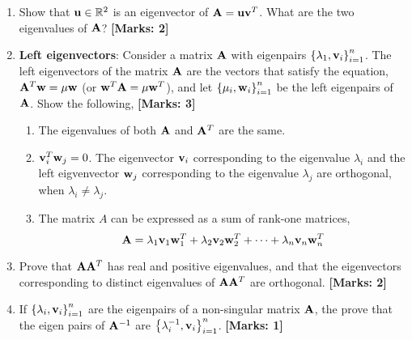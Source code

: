 \documentclass[12pt]{article}
\def\mf{\ensuremath\mathbf}
\def\mb{\ensuremath\mathbb}
\def\lc{\ensuremath\left\{}
\def\rc{\ensuremath\right\}}
\begin{document}
\begin{enumerate}
     \item Show that $\mf{u} \in \mb{R}^2$ is an eigenvector of $\mf{A} = \mf{u}\mf{v}^T$. What are the two eigenvalues of $\mf{A}$? \textbf{[Marks: 2]}

     \item \textbf{Left eigenvectors}: Consider a matrix $\mf{A}$ with eigenpairs $\lc \lambda_1, \mf{v}_i\rc_{i=1}^n$. The left eigenvectors of the matrix $\mf{A}$ are the vectors that satisfy the equation, $\mf{A}^T\mf{w} = \mu \mf{w}$ (or $\mf{w}^T\mf{A} = \mu \mf{w}^T$), and let $\lc \mu_i, \mf{w}_i\rc_{i=1}^n$ be the left eigenpairs of $\mf{A}$. Show the following, \textbf{[Marks: 3]}
     \begin{enumerate}
         \item The eigenvalues of both $\mf{A}$ and $\mf{A}^T$ are the same.
         \item $\mf{v}_i^T\mf{w}_j = 0$. The eigenvector $\mf{v}_i$ corresponding to the eigenvalue $\lambda_i$ and the left eigvenvector $\mf{w}_j$ corresponding to the eigenvalue $\lambda_j$ are orthogonal, when $\lambda_i \neq \lambda_j$.
         \item The matrix $A$ can be expressed as a sum of rank-one matrices,
         \[ \mf{A} = \lambda_1\mf{v}_1\mf{w}_1^T + \lambda_2\mf{v}_2\mf{w}_2^T + \cdots + \lambda_n\mf{v}_n\mf{w}_n^T\]
     \end{enumerate}

     \item Prove that $\mf{A}\mf{A}^T$ has real and positive eigenvalues, and that the eigenvectors corresponding to distinct eigenvalues of $\mf{A}\mf{A}^T$ are orthogonal. \textbf{[Marks: 2]}

     \item If $\lc \lambda_i, \mf{v}_i\rc_{i=1}^n$ are the eigenpairs of a non-singular matrix $\mf{A}$, the prove that the eigen pairs of $\mf{A}^{-1}$ are $\lc \lambda_i^{-1}, \mf{v}_i\rc_{i=1}^n$. \textbf{[Marks: 1]}
\end{enumerate}
\end{document}
